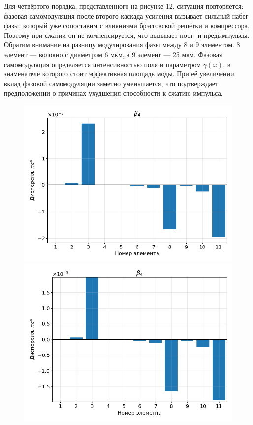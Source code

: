 \documentclass[12pt]{article}
\begin{document}
Для четвёртого порядка, представленного на рисунке 12, ситуация повторяется: фазовая самомодуляция после второго каскада
усиления вызывает сильный набег фазы, который уже сопоставим с влияниями брэгговской решётки и компрессора. Поэтому при
сжатии он не компенсируется, что вызывает пост- и предымпульсы. Обратим внимание на разницу модулирования фазы между
8 и 9 элементом. 8 элемент — волокно с диаметром 6 мкм, а 9 элемент — 25 мкм. Фазовая самомодуляция определяется интенсивностью
поля и параметром $\gamma(\omega)$, в знаменателе которого стоит эффективная площадь моды. При её увеличении вклад
фазовой самомодуляции заметно уменьшается, что подтверждает предположении о причинах ухудшения способности к сжатию
импульса.

\begin{figure}[h!]
    \centering
    \begin{minipage}[b]{0.5\textwidth}
        \includegraphics[width=\linewidth]{Images/Gauss Pulse/Беты/beta_4_full}
    \end{minipage}%
    \begin{minipage}[b]{0.5\textwidth}
        \includegraphics[width=\linewidth]{Images/Gauss Pulse/Беты/beta_4_cut}
    \end{minipage}


\end{figure}
\end{document}
